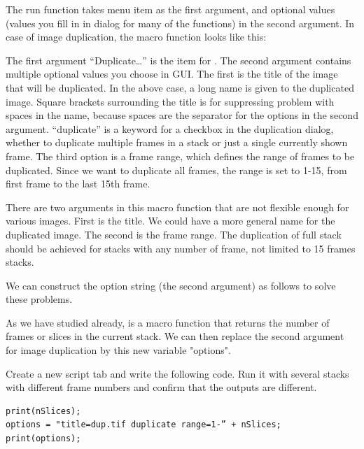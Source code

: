 The run function takes menu item as the first argument, and optional values (values you fill in in dialog for many of the functions) in the second argument. In case of image duplication, the macro function looks like this:


The first argument ``Duplicate\ldots'' is the item for . The second argument contains multiple optional values you choose in GUI. The first is the title of the image that will be duplicated. In the above case, a long name is given to the duplicated image. Square brackets surrounding the title is for suppressing problem with spaces in the name, because spaces are the separator for the options in the second argument. ``duplicate'' is a keyword for a checkbox in the duplication dialog, whether to duplicate multiple frames in a stack or just a single currently shown frame. The third option is a frame range, which defines the range of frames to be duplicated. Since we want to duplicate all frames, the range is set to 1-15, from first frame to the last 15th frame.

There are two arguments in this macro function that are not flexible enough for various images. First is the title. We could have a more general name for the duplicated image. The second is the frame range.  The duplication of full stack should be achieved for stacks with any number of frame, not limited to 15 frames stacks. 

We can construct the option string (the second argument) as follows to solve these problems. 


As we have studied already,  is a macro function that returns the number of frames or slices in the current stack. We can then replace the second argument for image duplication by this new variable "options". 


\begin{indentexercise}{2}
Create a new script tab and write the following code. Run it with several stacks with different frame numbers and confirm that the outputs are different. 
\begin{lstlisting}
print(nSlices);
options = "title=dup.tif duplicate range=1-” + nSlices;
print(options);
\end{lstlisting}
\end{indentexercise}

